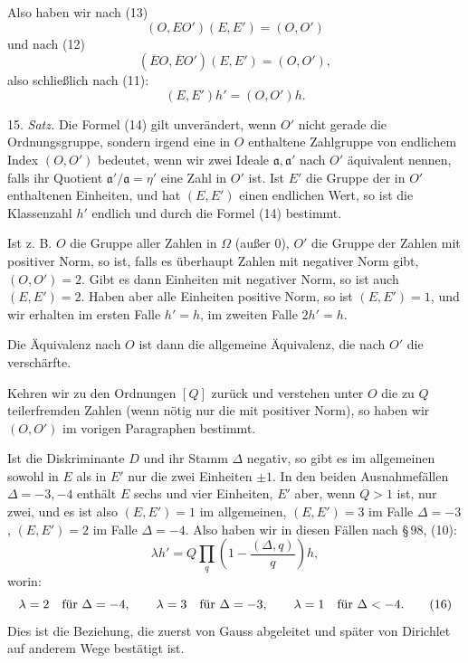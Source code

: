 \documentclass[11pt]{article}
\begin{document}
Also haben wir nach (13)
\[
 (O,EO')(E,E')=(O,O')
\]
und nach (12)
\[
 (\overline EO,\overline EO')(E,E')=(O,O'),
\]
also schließlich nach (11):
\begin{equation}
 (E,E')h'=(O,O')h.
\tag{14}
\end{equation}

15. \emph{Satz.} Die Formel (14) gilt unverändert, wenn \(O'\) nicht gerade die Ordnungsgruppe, sondern irgend eine in \(O\) enthaltene Zahlgruppe von endlichem Index \((O,O')\) bedeutet, wenn wir zwei Ideale \(\mathfrak a,\mathfrak a'\) nach \(O'\) äquivalent nennen, falls ihr Quotient \(\mathfrak a'/\mathfrak a=\eta'\) eine Zahl in \(O'\) ist. Ist \(E'\) die Gruppe der in \(O'\) enthaltenen Einheiten, und hat \((E,E')\) einen endlichen Wert, so ist die Klassenzahl \(h'\) endlich und durch die Formel (14) bestimmt.

Ist z. B. \(O\) die Gruppe aller Zahlen in \(\Omega\) (außer \(0\)), \(O'\) die Gruppe der Zahlen mit positiver Norm, so ist, falls es überhaupt Zahlen mit negativer Norm gibt, \((O,O')=2\). Gibt es dann Einheiten mit negativer Norm, so ist auch \((E,E')=2\). Haben aber alle Einheiten positive Norm, so ist \((E,E')=1\), und wir erhalten im ersten Falle \(h'=h\), im zweiten Falle \(2h'=h\).

Die Äquivalenz nach \(O\) ist dann die allgemeine Äquivalenz, die nach \(O'\) die verschärfte.

Kehren wir zu den Ordnungen \([Q]\) zurück und verstehen unter \(O\) die zu \(Q\) teilerfremden Zahlen (wenn nötig nur die mit positiver Norm), so haben wir \((O,O')\) im vorigen Paragraphen bestimmt.

Ist die Diskriminante \(D\) und ihr Stamm \(\Delta\) negativ, so gibt es im allgemeinen sowohl in \(E\) als in \(E'\) nur die zwei Einheiten \(\pm1\). In den beiden Ausnahmefällen \(\Delta=-3,-4\) enthält \(E\) sechs und vier Einheiten, \(E'\) aber, wenn \(Q>1\) ist, nur zwei, und es ist also \((E,E')=1\) im allgemeinen, \((E,E')=3\) im Falle \(\Delta=-3\), \((E,E')=2\) im Falle \(\Delta=-4\). Also haben wir in diesen Fällen nach \S\,98, (10):
\begin{equation}
 \lambda h'=Q\prod_q\left(1-\frac{(\Delta,q)}{q}\right)h,
\tag{15}
\end{equation}
worin:
\begin{equation}
 \lambda=2\quad\hbox{für }\Delta=-4,\qquad
 \lambda=3\quad\hbox{für }\Delta=-3,\qquad
 \lambda=1\quad\hbox{für }\Delta<-4.
\tag{16}
\end{equation}
Dies ist die Beziehung, die zuerst von Gauss abgeleitet und später von Dirichlet auf anderem Wege bestätigt ist.
\end{document}
